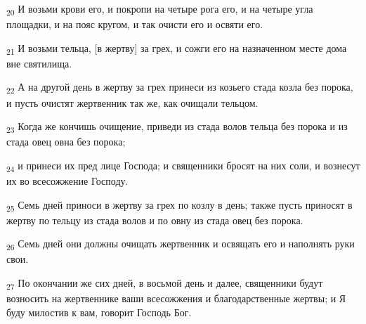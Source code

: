 \begin{tcolorbox}
\textsubscript{20} И возьми крови его, и покропи на четыре рога его, и на четыре угла площадки, и на пояс кругом, и так очисти его и освяти его.
\end{tcolorbox}
\begin{tcolorbox}
\textsubscript{21} И возьми тельца, [в жертву] за грех, и сожги его на назначенном месте дома вне святилища.
\end{tcolorbox}
\begin{tcolorbox}
\textsubscript{22} А на другой день в жертву за грех принеси из козьего стада козла без порока, и пусть очистят жертвенник так же, как очищали тельцом.
\end{tcolorbox}
\begin{tcolorbox}
\textsubscript{23} Когда же кончишь очищение, приведи из стада волов тельца без порока и из стада овец овна без порока;
\end{tcolorbox}
\begin{tcolorbox}
\textsubscript{24} и принеси их пред лице Господа; и священники бросят на них соли, и вознесут их во всесожжение Господу.
\end{tcolorbox}
\begin{tcolorbox}
\textsubscript{25} Семь дней приноси в жертву за грех по козлу в день; также пусть приносят в жертву по тельцу из стада волов и по овну из стада овец без порока.
\end{tcolorbox}
\begin{tcolorbox}
\textsubscript{26} Семь дней они должны очищать жертвенник и освящать его и наполнять руки свои.
\end{tcolorbox}
\begin{tcolorbox}
\textsubscript{27} По окончании же сих дней, в восьмой день и далее, священники будут возносить на жертвеннике ваши всесожжения и благодарственные жертвы; и Я буду милостив к вам, говорит Господь Бог.
\end{tcolorbox}
